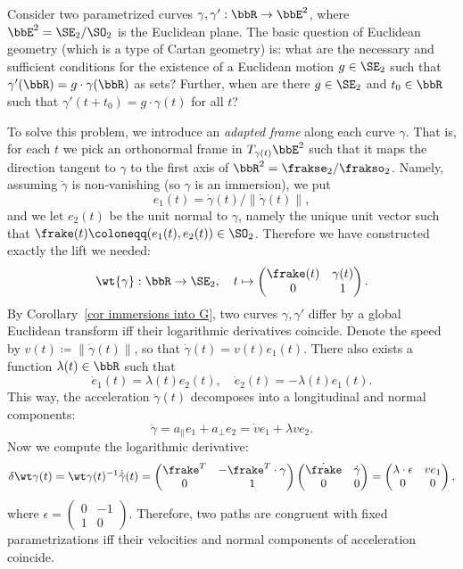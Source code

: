 \begin{example}\label{ex curves in E2}
    Consider two parametrized curves $\gamma,\gamma':\bbR\to \bbE^2$, where $\bbE^2=\SE_2\slash\SO_2$ is the Euclidean plane. The basic question of Euclidean geometry (which is a type of Cartan geometry) is: what are the necessary and sufficient conditions for the existence of a Euclidean motion $g\in\SE_2$ such that $\gamma'(\bbR)=g\cdot \gamma(\bbR)$ as sets? Further, when are there $g\in\SE_2$ and $t_0\in\bbR$ such that $\gamma'(t+t_0)=g\cdot \gamma(t)$ for all $t$?

    To solve this problem, we introduce an \emph{adapted frame} along each curve $\gamma$. That is, for each $t$ we pick an orthonormal frame in $T_{\gamma(t)}\bbE^2$ such that it maps the direction tangent to $\gamma$ to the first axis of $\bbR^2=\frakse_2\slash\frakso_2$. Namely, assuming $\dot\gamma$ is non-vanishing (so $\gamma$ is an immersion), we put 
    \[e_1(t)=\dot\gamma(t)\slash \lVert\dot\gamma(t)\rVert,\] 
    and we let $e_2(t)$ be the unit normal to $\gamma$, namely the unique unit vector such that $\frake(t)\coloneqq (e_1(t),e_2(t))\in\SO_2$. Therefore we have constructed exactly the lift we needed:
    \[\wt{\gamma}:\bbR\to \SE_2,\quad t\mapsto\begin{pmatrix}
        \frake(t)&\gamma(t) \\
        0&  1
    \end{pmatrix}.\]
    By Corollary~\ref{cor immersions into G}, two curves $\gamma,\gamma'$ differ by a global Euclidean transform iff their logarithmic derivatives coincide. Denote the speed by $v(t)\coloneqq \lVert\dot\gamma(t)\rVert$, so that $\dot\gamma(t)=v(t)e_1(t)$. There also exists a function $\lambda(t)\in\bbR$ such that 
    \[\dot e_1(t)=\lambda(t)e_2(t),\quad \dot e_2(t)=-\lambda(t)e_1(t).\]
    This way, the acceleration $\ddot{\gamma}(t)$ decomposes into a longitudinal and normal components:
    \[\ddot\gamma=a_{\parallel}e_1+a_{\perp}e_2=\dot ve_1+\lambda ve_2.\]
    Now we compute the logarithmic derivative:
    \[\delta\wt\gamma(t)=\wt\gamma(t)^{-1}\dot{\tilde\gamma}(t)=
    \begin{pmatrix}
        \frake^T & -\frake^T\cdot\gamma\\
        0 & 1
    \end{pmatrix} 
    \begin{pmatrix}
        \dot\frake & \dot\gamma\\
        0 & 0
    \end{pmatrix}
    =
    \begin{pmatrix}
        \lambda\cdot\epsilon & ve_1\\
        0 & 0
    \end{pmatrix},
    \]
    where $\epsilon=\left(\begin{smallmatrix}
        0&-1\\
        1&0
    \end{smallmatrix}\right)$. Therefore, two paths are congruent with fixed parametrizations iff their velocities and normal components of acceleration coincide. 
    

\end{example}
